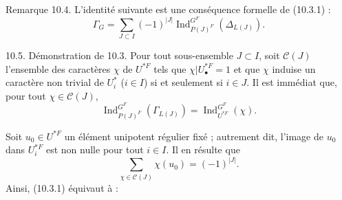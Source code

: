 \documentclass[9pt,twoside]{extarticle}
\begin{document}
{Remarque 10.4. L'identité suivante est une conséquence formelle de (10.3.1) : \[
\Gamma_G
=
\sum_{J\subset I}(-1)^{|J|}
\operatorname{Ind}_{P(J)^F}^{G^F}(\Delta_{L(J)}).
\]\par

10.5. Démonstration de 10.3. Pour tout sous-ensemble \(J\subset I\), soit \(\mathcal C(J)\) l'ensemble des caractères \(\chi\) de \(U^{*F}\) tels que \(\chi|U_\bullet^{*F}=1\) et que \(\chi\) induise un caractère non trivial de \(U_i^*\) (\(i\in I\)) si et seulement si \(i\in J\). Il est immédiat que, pour tout \(\chi\in\mathcal C(J)\), \[
\operatorname{Ind}_{P(J)^F}^{G^F}(\Gamma_{L(J)})
=
\operatorname{Ind}_{U^{*F}}^{G^F}(\chi).
\]\par

Soit \(u_0\in U^{*F}\) un élément unipotent régulier fixé ; autrement dit, l'image de \(u_0\) dans \(U_i^{*F}\) est non nulle pour tout \(i\in I\). Il en résulte que \[
\sum_{\chi\in\mathcal C(J)}\chi(u_0)=(-1)^{|J|}.
\] Ainsi, (10.3.1) équivaut à :\par
}
\end{document}

